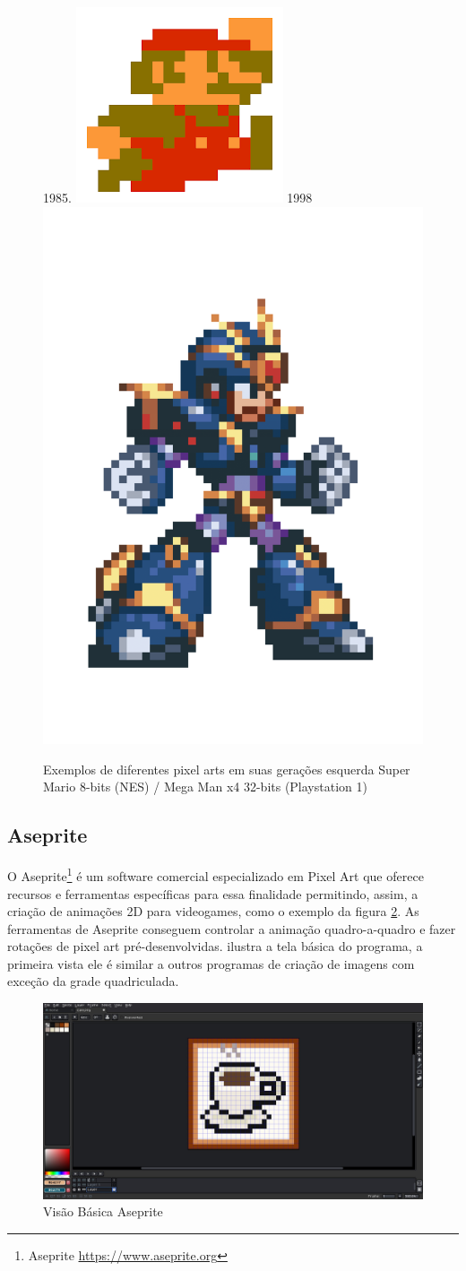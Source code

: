 \begin{figure}[ht!]
    \caption{Exemplos de diferentes pixel arts em suas gerações esquerda Super Mario 8-bits (NES) /  Mega Man x4 32-bits (Playstation 1)}
    \label{fig:comparative-8bit-32-bit-pixel-art}
    \subfloat\label{fig:mario}1985.{
        \includegraphics[width=0.35\linewidth]{figuras/mario-sprite-nes.png}
    }\hfill
    \subfloat\label{fig:mega_man}1998{
        \includegraphics[width=0.3\linewidth]{figuras/mega-man-ps1.png}
    }
\end{figure}

\newpage
\subsection{Aseprite}  
\label{sec:aseprite}
O Aseprite\footnote{Aseprite \url{https://www.aseprite.org}} é um software comercial especializado em Pixel Art que oferece recursos e ferramentas específicas para essa finalidade permitindo, assim, a criação de animações 2D para videogames, como o exemplo da figura \ref{fig:aseprite}. As ferramentas de Aseprite conseguem controlar
a animação quadro-a-quadro e fazer rotações de pixel art pré-desenvolvidas.
ilustra a tela básica do programa, a primeira vista ele é similar a outros programas de criação de imagens com exceção da grade quadriculada.  
\begin{figure}[ht!]
    \centering
    \includegraphics[width=1\linewidth]{figuras/aseprite.jpg}
    \caption{Visão Básica Aseprite}
    \label{fig:aseprite}
\end{figure}

